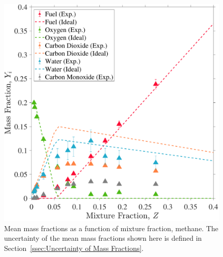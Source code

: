 \documentclass[12pt]{article}
\begin{document}
\begin{figure}[!]
	\centering
\includegraphics[width=\textwidth,keepaspectratio]{Adjusted_FuelMethane_Mixture_Fraction_Intermediate_Plot.pdf}
	\caption[Mean mass fractions as a function of mixture fraction, methane]{Mean mass fractions as a function of mixture fraction, methane. The uncertainty of the mean mass fractions shown here is defined in Section~\ref{ssec:Uncertainty of Mass Fractions}.}
	\label{fig:Methane_Mix_Frac}
\end{figure}
\end{document}
